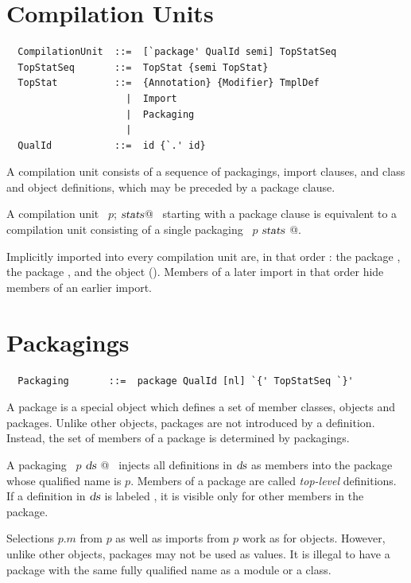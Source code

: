 \section{Compilation Units}

\syntax\begin{lstlisting}
  CompilationUnit  ::=  [`package' QualId semi] TopStatSeq
  TopStatSeq       ::=  TopStat {semi TopStat}
  TopStat          ::=  {Annotation} {Modifier} TmplDef
                     |  Import
                     |  Packaging
                     |
  QualId           ::=  id {`.' id}
\end{lstlisting}

A compilation unit consists of a sequence of packagings, import
clauses, and class and object definitions, which may be preceded by a
package clause.

A compilation unit ~\lstinline@package $p$; $\mbox{\sl stats}$@~ starting with a package
clause is equivalent to a compilation unit consisting of a single
packaging ~\lstinline@package $p$ { $\mbox{\sl stats}$ }@.

Implicitly imported into every compilation unit are, in that order :
the package , the package , and the object
 (). Members of a later import in
that order hide members of an earlier import.

\section{Packagings}\label{sec:packagings}

\syntax\begin{lstlisting}
  Packaging       ::=  package QualId [nl] `{' TopStatSeq `}'
\end{lstlisting}

A package is a special object which defines a set of member classes,
objects and packages.  Unlike other objects, packages are not introduced
by a definition.  Instead, the set of members of a package is determined by
packagings.

A packaging ~\lstinline@package $p$ { $\mbox{\sl ds}$ }@~ injects all
definitions in $\mbox{\sl ds}$ as members into the package whose qualified name
is $p$. Members of a package are called {\em top-level} definitions.
If a definition in $\mbox{\sl ds}$ is labeled , it is
visible only for other members in the package.

Selections $p$.$m$ from $p$ as well as imports from $p$
work as for objects. However, unlike other objects, packages may not
be used as values. It is illegal to have a package with the same fully
qualified name as a module or a class.

